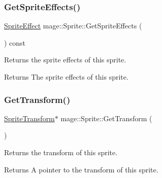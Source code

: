 \hypertarget{classmage_1_1_sprite_a1a969b7cf3f1892894710a80582b4cd2}{}\label{classmage_1_1_sprite_a1a969b7cf3f1892894710a80582b4cd2} 
\subsubsection{\texorpdfstring{Get\+Sprite\+Effects()}{GetSpriteEffects()}}
{\footnotesize\ttfamily \hyperlink{namespacemage_a9cfe18123066ba4236f548f9de75d881}{Sprite\+Effect} mage\+::\+Sprite\+::\+Get\+Sprite\+Effects (\begin{DoxyParamCaption}{ }\end{DoxyParamCaption}) const\hspace{0.3cm}{\ttfamily [noexcept]}}

Returns the sprite effects of this sprite.

\begin{DoxyReturn}{Returns}
The sprite effects of this sprite. 
\end{DoxyReturn}
\hypertarget{classmage_1_1_sprite_aa28e031e38c51619b3bd7853d212ae06}{}\label{classmage_1_1_sprite_aa28e031e38c51619b3bd7853d212ae06} 
\subsubsection{\texorpdfstring{Get\+Transform()}{GetTransform()}\hspace{0.1cm}{\footnotesize\ttfamily [1/2]}}
{\footnotesize\ttfamily \hyperlink{classmage_1_1_sprite_transform}{Sprite\+Transform}$\ast$ mage\+::\+Sprite\+::\+Get\+Transform (\begin{DoxyParamCaption}{ }\end{DoxyParamCaption})\hspace{0.3cm}{\ttfamily [noexcept]}}

Returns the transform of this sprite.

\begin{DoxyReturn}{Returns}
A pointer to the transform of this sprite. 
\end{DoxyReturn}
\hypertarget{classmage_1_1_sprite_a8e2c0ae634492efacc92aab2e18e701c}{}\label{classmage_1_1_sprite_a8e2c0ae634492efacc92aab2e18e701c} 
